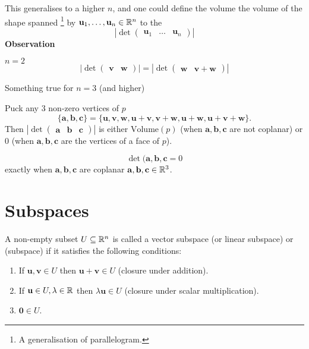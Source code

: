 \documentclass[10pt, a4paper]{article}
\newcommand{\mbf}[1]{\mathbf{#1}}
\begin{document}
This generalises to a higher $n$,
and one could define the volume the volume of the shape spanned
\footnote{A generalisation of parallelogram.}
by $\mbf{u}_1, \dotsc, \mbf{u}_n \in \R ^ n$ to the
\[
\left|\det\begin{pmatrix}
    \mbf{u}_1 & \dotsc & \mbf{u}_n
\end{pmatrix}\right|
\]
\textbf{Observation}

$n = 2$
\[
\left|\det\begin{pmatrix}
    \mbf{v} & \mbf{w}
\end{pmatrix}\right| = \left|\det\begin{pmatrix}
    \mbf{w} & \mbf{v} + \mbf{w}
\end{pmatrix}\right|
\]

Something true for $n = 3$
(and higher)

Puck any $3$ non-zero vertices of $p$
\[
\{\mbf{a}, \mbf{b}, \mbf{c}\} = \{\mbf{u, v, w, u + v, v + w, u + w, u + v + w}\}.
\]
Then $\left|\det\begin{pmatrix}
    \mbf{a} & \mbf{b} & \mbf{c}
\end{pmatrix}\right|$ is either $\mathrm{Volume}(p)$
(when $\mbf{a, b, c}$ are not coplanar)
or $0$
(when $\mbf{a, b, c}$ are the vertices of a face of $p$).

\[
\det(\mbf{a, b, c} = 0
\]
exactly when $\mbf{a, b, c}$ are coplanar $\mbf{a, b, c} \in \R ^ 3$.

\newpage

\section{Subspaces}

\begin{definition}
    A non-empty subset $U \subseteq \mathbb{R} ^ n$ is called a vector subspace
    (or linear subspace)
    or
    (subspace)
    if it satisfies the following conditions:
    \begin{enumerate}[label = (\roman*)]
        \item If $\mbf{u}, \mbf{v} \in U$ then $\mbf{u + v} \in U$
        (closure under addition).
        \item If $\mbf{u} \in U, \lambda \in \R$ then $\lambda\mbf{u} \in U$
        (closure under scalar multiplication).
        \item $\mbf{0} \in U$.
    \end{enumerate}
\end{definition}
\end{document}
